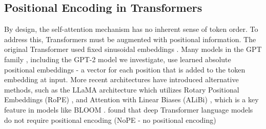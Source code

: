 \documentclass[11pt]{article}
\begin{document}
\subsection{Positional Encoding in Transformers}
By design, the self-attention mechanism has no inherent sense of token order. To address this, Transformers must be augmented with positional information. The original Transformer used fixed sinusoidal embeddings \citep{vaswani2017attention}. Many models in the GPT family \cite{Radford2018ImprovingLU}, including the GPT-2 model we investigate, use learned absolute positional embeddings - a vector for each position that is added to the token embedding at input. More recent architectures have introduced alternative methods, such as the LLaMA architecture \citep{touvron2023llama2} which utilizes Rotary Positional Embeddings (RoPE) \citep{su2021roformer}, and Attention with Linear Biases (ALiBi) \citep{press2021train}, which is a key feature in models like BLOOM \citep{bigscience2023bloom}. \citet{Irie2019LanguageMW} found that deep Transformer language models do not require positional
encoding (NoPE - no positional encoding)
\end{document}
